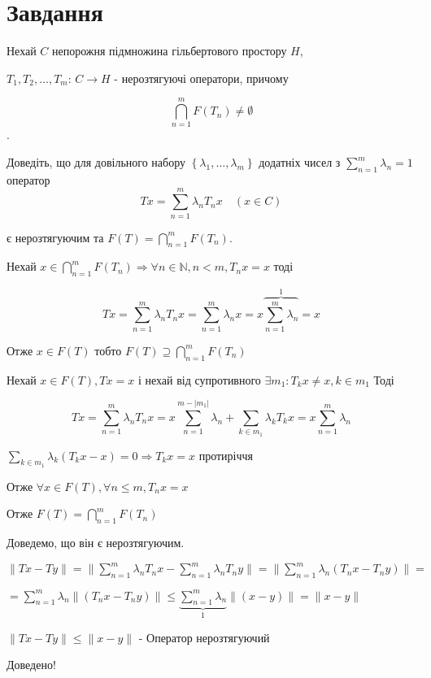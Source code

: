 
\chapter{Завдання \theHchapter}

\begin{tcolorbox}[title=Завдання]
    Нехай $C$ непорожня підмножина гільбертового простору $H$, 


    $T_{1}, T_{2}, \ldots, T_{m}$: $C \rightarrow H$ - 
    нерозтягуючі оператори, причому 


    $$\bigcap\limits_{n=1}^{m} F\left(T_{n}\right) \neq \emptyset$$. 
    
    
    Доведіть, що для довільного набору 
    $\left\{\lambda_{1}, \ldots, \lambda_{m}\right\}$ 
    додатніх чисел з $ \sum\limits_{n=1}^{m} \lambda_{n}=1$ оператор
    $$T x=\sum_{n=1}^{m} \lambda_{n} T_{n} x \quad(x \in C)$$

    є нерозтягуючим та $F(T)=\bigcap\limits_{n=1}^{m} F\left(T_{n}\right)$.

\end{tcolorbox}



Нехай $x \in \bigcap\limits_{n = 1}^{m}F(T_n) \Rightarrow 
\forall n \in \mathbb{N}, n < m, T_nx = x$ тоді 


$$Tx = \sum\limits_{n=1}^{m} \lambda_nT_nx = \sum\limits_{n=1}^{m}\lambda_nx = 
x \overbrace{\sum\limits_{n=1}^{m}\lambda_n}^{\mbox{1}} = x$$

Отже $x \in F(T)$ тобто $F(T)\supseteq\bigcap\limits_{n=1}^{m} F(T_{n})$


Нехай $x \in F(T), Tx = x$ і нехай від супротивного $\exists m_1: T_{k}x \neq x, 
k \in m_1$ Тоді 


$$Tx = \sum_{n = 1}^{m}\lambda_nT_nx = x\sum_{n = 1}^{m - |m_1|}\lambda_n + 
\sum_{k \in m_1}\lambda_k T_kx = x\sum_{n=1}^{m}\lambda_n$$


$\sum\limits_{k\in m_1} \lambda_k (T_kx - x) = 0 \Rightarrow T_kx = x$
протиріччя


Отже $\forall x \in F(T), \forall n \le m, T_nx = x$


Отже $F(T) = \bigcap\limits_{n=1}^{m} F(T_{n})$


Доведемо, що він є нерозтягуючим.


$\|Tx - Ty\| = \|\sum\limits_{n=1}^{m} \lambda_{n} T_{n} x - 
\sum\limits_{n=1}^{m} \lambda_{n} T_{n} y \| = 
\|\sum\limits_{n=1}^{m} \lambda_{n} (T_{n}x - T_ny)\| = $


$=\sum\limits_{n=1}^{m} \lambda_{n} \|(T_{n}x - T_ny)\| \le 
\underbrace{\sum\limits_{n=1}^{m} \lambda_{n}}_{\mbox{1}} \|(x - y)\| = 
\|x - y\|$


$\|Tx - Ty\| \le \|x - y\|$ - Оператор нерозтягуючий


Доведено!